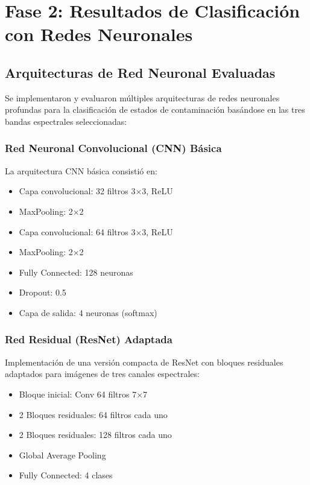 \section{Fase 2: Resultados de Clasificación con Redes Neuronales}

\subsection{Arquitecturas de Red Neuronal Evaluadas}

Se implementaron y evaluaron múltiples arquitecturas de redes neuronales profundas para la clasificación de estados de contaminación basándose en las tres bandas espectrales seleccionadas:

\subsubsection{Red Neuronal Convolucional (CNN) Básica}

La arquitectura CNN básica consistió en:
\begin{itemize}
    \item Capa convolucional: 32 filtros 3×3, ReLU
    \item MaxPooling: 2×2
    \item Capa convolucional: 64 filtros 3×3, ReLU  
    \item MaxPooling: 2×2
    \item Fully Connected: 128 neuronas
    \item Dropout: 0.5
    \item Capa de salida: 4 neuronas (softmax)
\end{itemize}

\subsubsection{Red Residual (ResNet) Adaptada}

Implementación de una versión compacta de ResNet con bloques residuales adaptados para imágenes de tres canales espectrales:
\begin{itemize}
    \item Bloque inicial: Conv 64 filtros 7×7
    \item 2 Bloques residuales: 64 filtros cada uno
    \item 2 Bloques residuales: 128 filtros cada uno  
    \item Global Average Pooling
    \item Fully Connected: 4 clases
\end{itemize}

